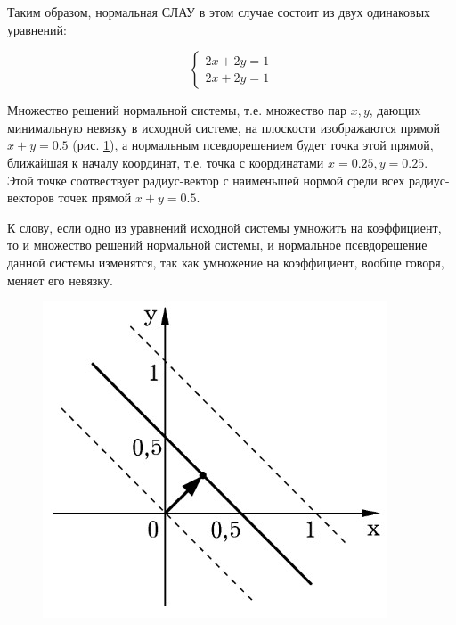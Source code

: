 \begin{example}
    Таким образом, нормальная СЛАУ в этом случае состоит из двух одинаковых уравнений:

    \begin{equation}
        \begin{cases}
            2x + 2y = 1 \\
            2x + 2y = 1
        \end{cases}
    \end{equation}

    Множество решений нормальной системы, т.е. множество пар $x, y$, дающих минимальную невязку в исходной системе, на плоскости изображаются прямой $x + y = 0.5$ (рис. \ref{fig:picture_16_1}), а нормальным псевдорешением будет точка этой прямой, ближайшая к началу координат, т.е. точка с координатами $x = 0.25, y = 0.25$. Этой точке соотвествует радиус-вектор с наименьшей нормой среди всех радиус-векторов точек прямой $x + y = 0.5$.

    К слову, если одно из уравнений исходной системы умножить на коэффициент, то и множество решений нормальной системы, и нормальное псевдорешение данной системы изменятся, так как умножение на коэффициент, вообще говоря, меняет его невязку.

    \begin{figure}[H]
        \centering
        \includegraphics[scale=0.45]{images/16_1.jpg}
        \label{fig:picture_16_1}
        \caption{}
    \end{figure}

\end{example}

